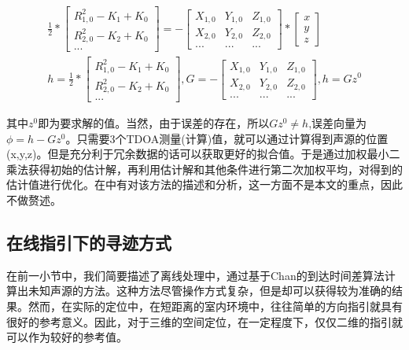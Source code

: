\documentclass[winfonts]{njuthesis}
\begin{document}
		\begin{equation}
		\begin{aligned}
			& \frac{1}{2} * {
				\left[ 
					\begin{array}{c}
						R_{1,0}^2 - K_1 + K_0 \\
						R_{2,0}^2 - K_2 + K_0 \\
						...
					\end{array} 
				\right ]}
				= -{
				\left[ 
					\begin{array}{ccc}
						X_{1,0} & Y_{1,0} & Z_{1,0} \\
						X_{2,0} & Y_{2,0} & Z_{2,0} \\
						  ...   &  ...    &   ...
					\end{array}
				\right ]}*{
				\left[ 
					\begin{array}{c}
						x\\
						y\\
						z
					\end{array}
				\right ]} & \\
			& h = \frac{1}{2} * {
				\left[ 
				\begin{array}{c}
				R_{1,0}^2 - K_1 + K_0 \\
				R_{2,0}^2 - K_2 + K_0 \\
				...
				\end{array} 
				\right ]}, 
			G = -{
				\left[ 
				\begin{array}{ccc}
				X_{1,0} & Y_{1,0} & Z_{1,0} \\
				X_{2,0} & Y_{2,0} & Z_{2,0} \\
				...   &  ...    &   ...
				\end{array}
				\right ]},
			h = Gz^0
		\end{aligned}
		\end{equation}

		其中$z^0$即为要求解的值。当然，由于误差的存在，所以$Gz^0\neq h$,误差向量为$\phi = h - Gz^0$。只需要3个TDOA测量(计算)值，就可以通过计算得到声源的位置(x,y,z)。但是充分利于冗余数据的话可以获取更好的拟合值。于是通过加权最小二乘法获得初始的估计解，再利用估计解和其他条件进行第二次加权平均，对得到的估计值进行优化。在\cite{Chan3DTDOA}中有对该方法的描述和分析，这一方面不是本文的重点，因此不做赘述。
		
		\subsection{在线指引下的寻迹方式}
		
		在前一小节中，我们简要描述了离线处理中，通过基于Chan的到达时间差算法计算出未知声源的方法。这种方法尽管操作方式复杂，但是却可以获得较为准确的结果。然而，在实际的定位中，在短距离的室内环境中，往往简单的方向指引就具有很好的参考意义。因此，对于三维的空间定位，在一定程度下，仅仅二维的指引就可以作为较好的参考值。
		
\end{document}
